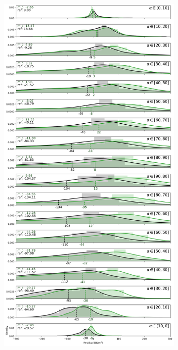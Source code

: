 \begin{figure}[htb!]
    \centering
    \begin{subfigure}{\columnwidth}
        \includegraphics[width=\columnwidth]{figures/first_study/residual_errors_mlp_site1_rmse.png}

\end{subfigure}
\end{figure}
